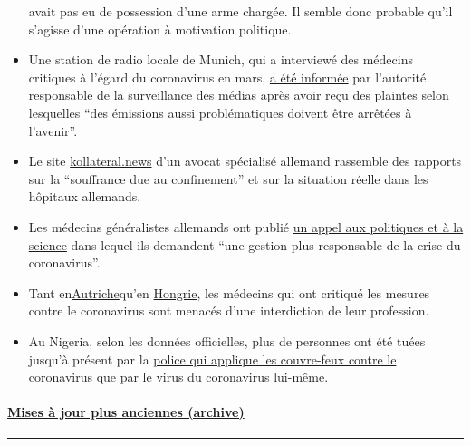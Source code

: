\begin{itemize}
  avait pas eu de possession d'une arme chargée. Il semble donc probable
  qu'il s'agisse d'une opération à motivation politique.
\item
  Une station de radio locale de Munich, qui a interviewé des médecins
  critiques à l'égard du coronavirus en mars,
  \href{https://norberthaering.de/medienversagen/radiomuenchen-blm-meinungsvielfalt/}{a
  été informée} par l'autorité responsable de la surveillance des médias
  après avoir reçu des plaintes selon lesquelles ``des émissions aussi
  problématiques doivent être arrêtées à l'avenir''.
\item
  Le site \href{https://kollateral.news/}{kollateral.news} d'un avocat
  spécialisé allemand rassemble des rapports sur la ``souffrance due au
  confinement'' et sur la situation réelle dans les hôpitaux allemands.
\item
  Les médecins généralistes allemands ont publié
  \href{https://aerzteinnenvorort.de/der-appell}{un appel aux politiques
  et à la science} dans lequel ils demandent ``une gestion plus
  responsable de la crise du coronavirus''.
\item
  Tant
  en\href{https://www.sn.at/panorama/oesterreich/arzt-droht-berufsverbot-wegen-kritik-an-corona-massnahmen-86594140}{Autriche}qu'en
  \href{https://magyarhang.org/belfold/2020/04/16/etikai-vizsgalat-indul-az-orvos-ellen-aki-szerint-nincs-jarvany-es-az-idosek-csak-a-felelemtol-halnak-meg/}{Hongrie},
  les médecins qui ont critiqué les mesures contre le coronavirus sont
  menacés d'une interdiction de leur profession.
\item
  Au Nigeria, selon les données officielles, plus de personnes ont été
  tuées jusqu'à présent par la
  \href{https://www.bbc.com/news/world-africa-52317196}{police qui
  applique les couvre-feux contre le coronavirus} que par le virus du
  coronavirus lui-même.
\end{itemize}

\hypertarget{mises-uxe0-jour-plus-anciennes-archive}{%
\paragraph{\texorpdfstring{\href{https://swprs.org/les-faits-sur-le-coronavirus-archive/}{Mises
à jour plus anciennes
(archive)}}{Mises à jour plus anciennes (archive)}}\label{mises-uxe0-jour-plus-anciennes-archive}}

\begin{center}\rule{0.5\linewidth}{\linethickness}\end{center}

